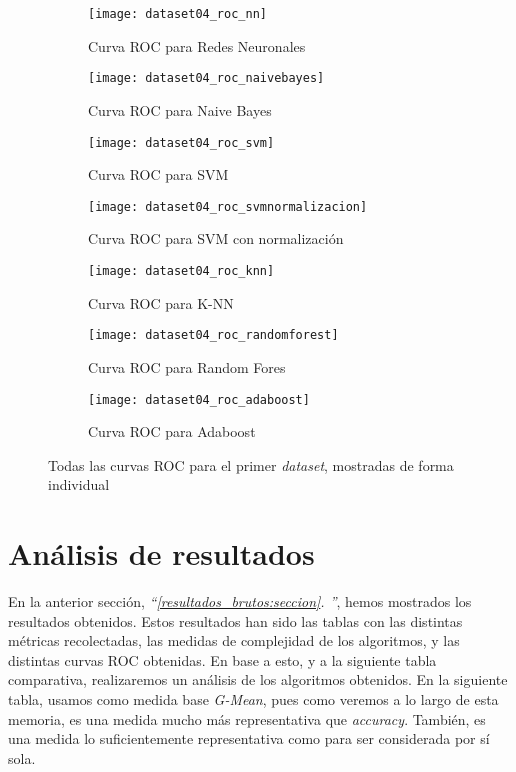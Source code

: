 \documentclass[11pt]{article}
\newcommand{\customcite}[1]{\emph{``\ref{#1}. \nameref{#1}''}}
\begin{document}
\begin{figure}[H]
    \centering

    \begin{subfigure}[b]{0.4 \textwidth}
        \texttt{[image: dataset04\_roc\_nn]}
        \caption{Curva ROC para Redes Neuronales}
    \end{subfigure}
    \begin{subfigure}[b]{0.4 \textwidth}
        \texttt{[image: dataset04\_roc\_naivebayes]}
        \caption{Curva ROC para Naive Bayes}
    \end{subfigure}

    \begin{subfigure}[b]{0.4 \textwidth}
        \texttt{[image: dataset04\_roc\_svm]}
        \caption{Curva ROC para SVM}
    \end{subfigure}
    \begin{subfigure}[b]{0.4 \textwidth}
        \texttt{[image: dataset04\_roc\_svmnormalizacion]}
        \caption{Curva ROC para SVM con normalización}
    \end{subfigure}

    \begin{subfigure}[b]{0.4 \textwidth}
        \texttt{[image: dataset04\_roc\_knn]}
        \caption{Curva ROC para K-NN}
    \end{subfigure}
    \begin{subfigure}[b]{0.4 \textwidth}
        \texttt{[image: dataset04\_roc\_randomforest]}
        \caption{Curva ROC para Random Fores}
    \end{subfigure}

    \begin{subfigure}[b]{0.4 \textwidth}
        \texttt{[image: dataset04\_roc\_adaboost]}
        \caption{Curva ROC para Adaboost}
    \end{subfigure}

    \caption{Todas las curvas ROC para el primer \emph{dataset}, mostradas de forma individual}
\end{figure}


\pagebreak

\section{Análisis de resultados}

En la anterior sección, \customcite{resultados_brutos:seccion}, hemos mostrados los resultados obtenidos. Estos resultados han sido las tablas con las distintas métricas recolectadas, las medidas de complejidad de los algoritmos, y las distintas curvas ROC obtenidas. En base a esto, y a la siguiente tabla comparativa, realizaremos un análisis de los algoritmos obtenidos. En la siguiente tabla, usamos como medida base \emph{G-Mean}, pues como veremos a lo largo de esta memoria, es una medida mucho más representativa que \emph{accuracy}. También, es una medida lo suficientemente representativa como para ser considerada por sí sola.
\end{document}
